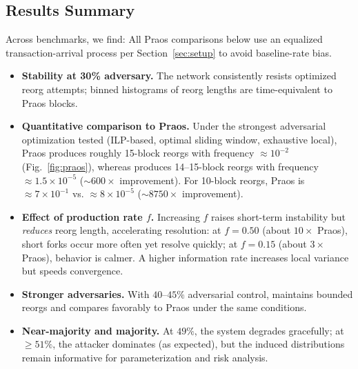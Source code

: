 \subsection{Results Summary}
Across benchmarks, we find:
All Praos comparisons below use an equalized transaction-arrival process per Section~\ref{sec:setup} to avoid baseline-rate bias.
\begin{itemize}
\item \textbf{Stability at 30\% adversary.} The network consistently resists optimized reorg attempts; binned histograms of reorg lengths are time-equivalent to Praos blocks.
\item \textbf{Quantitative comparison to Praos.} Under the strongest adversarial optimization tested (ILP-based, optimal sliding window, exhaustive local), Praos produces roughly 15-block reorgs with frequency $\approx 10^{-2}$ (Fig.~\ref{fig:praos}), whereas \ProjBase{} produces 14--15-block reorgs with frequency $\approx 1.5\times 10^{-5}$ ($\sim 600\times$ improvement). For 10-block reorgs, Praos is $\approx 7\times 10^{-1}$ vs. \ProjBase{} $\approx 8\times 10^{-5}$ ($\sim 8750\times$ improvement).
\item \textbf{Effect of production rate $f$.} Increasing $f$ raises short-term instability but \emph{reduces} reorg length, accelerating resolution: at $f=0.50$ (about $10\times$ Praos), short forks occur more often yet resolve quickly; at $f=0.15$ (about $3\times$ Praos), behavior is calmer. A higher information rate increases local variance but speeds convergence.
\item \textbf{Stronger adversaries.} With $40$--$45\%$ adversarial control, \ProjBase{} maintains bounded reorgs and compares favorably to Praos under the same conditions.
\item \textbf{Near-majority and majority.} At $49\%$, the system degrades gracefully; at $\ge 51\%$, the attacker dominates (as expected), but the induced distributions remain informative for parameterization and risk analysis.
\end{itemize}
